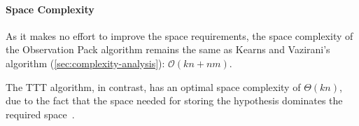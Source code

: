 \documentclass[multi,crop=false,class=article]{standalone}
\begin{document}
\paragraph{Space Complexity} As it makes no effort to improve the space
requirements, the space complexity of the Observation Pack algorithm remains the
same as Kearns and Vazirani's algorithm (\cref{sec:complexity-analysis}):
$\mathcal{O}(kn + nm)$.

The TTT algorithm, in contrast, has an optimal space complexity of $\Theta(kn)$,
due to the fact that the space needed for storing the hypothesis dominates the
required space~\cite{Isberner2014b,Isberner2015a}.
\end{document}

